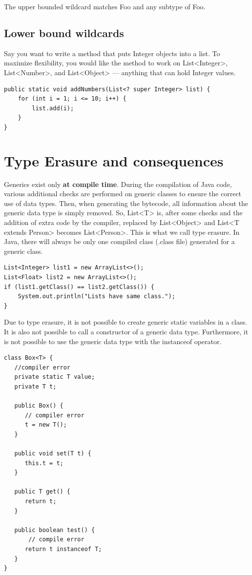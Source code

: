 The upper bounded wildcard matches Foo and any subtype of Foo.

\subsection{Lower bound wildcards}


Say you want to write a method that puts Integer objects into a list. To maximize flexibility, you would like the method to work on List<Integer>, List<Number>, and List<Object> — anything that can hold Integer values.

\begin{lstlisting}
public static void addNumbers(List<? super Integer> list) {
    for (int i = 1; i <= 10; i++) {
        list.add(i);
    }
}
\end{lstlisting}


\section{Type Erasure and consequences}

Generics exist only \textbf{at compile time}. During the compilation of Java code,  various additional checks are performed on generic classes to ensure the correct use of data types. Then, when generating the bytecode, all information about the generic data type is simply removed. So,  List<T> is, after some checks and the addition of extra code by the compiler, replaced by List<Object> and List<T extends Person> becomes List<Person>. This is what we call type erasure.  In Java, there will always be only one compiled class (.class file) generated for a generic class.

\begin{lstlisting}
List<Integer> list1 = new ArrayList<>();
List<Float> list2 = new ArrayList<>();
if (list1.getClass() == list2.getClass()) {
	System.out.println("Lists have same class.");
}
\end{lstlisting}

Due to type erasure, it is not possible to create generic static variables in a class. It is also not possible to call a constructor of a generic data type. Furthermore, it is not possible to use the generic data type with the instanceof operator.

\begin{lstlisting}
class Box<T> {
   //compiler error
   private static T value;
   private T t;
   
   public Box() {
      // compiler error
   	  t = new T();
   }

   public void set(T t) {
      this.t = t;
   }

   public T get() {
      return t;
   } 
   
   public boolean test() {
       // compile error
	  return t instanceof T;
   }  
}
\end{lstlisting}


